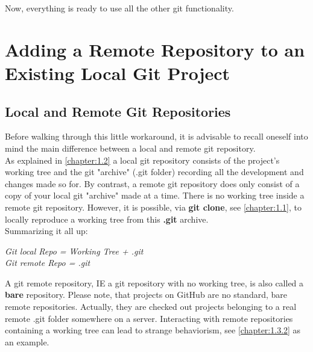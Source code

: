 Now, everything is ready to use all the other git functionality.



\section{Adding a Remote Repository to an Existing Local Git Project}
\label{chapter:1.3}



\subsection{Local and Remote Git Repositories}
\label{chapter:1.3.1}
Before walking through this little workaround, it is advisable to recall oneself into mind the main difference between a local and remote git 
repository.
\\ 
As explained in \cref{chapter:1.2} a local git repository consists of the project's working tree and the git "archive" (.git folder) recording all the development and 
changes made so for. By contrast, a remote git repository does only consist of a copy of your local git "archive" made at a time. There is no working tree inside a remote 
git repository. However, it is possible, via \textbf{git clone}, see \cref{chapter:1.1}, to locally reproduce a working tree from this \textbf{.git} archive.
\\
Summarizing it all up:

\textit{
	\hspace*{1cm} Git local Repo \hspace*{0.25cm} = Working Tree + .git  \\
	\hspace*{1.15cm} Git remote Repo = .git
}

A git remote repository, \ac{IE} a git repository with no working tree, is also called a \textbf{bare} repository. Please note, that projects on GitHub are no standard, 
bare remote repositories. Actually, they are checked out projects belonging to a real remote .git folder somewhere on a server. Interacting with remote repositories 
containing a working tree can lead to strange behaviorism, see \cref{chapter:1.3.2} as an example.  



